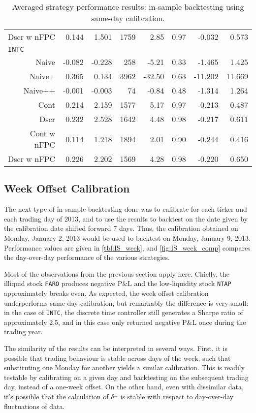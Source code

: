 \begin{table}
\begin{tabular}{@{} *{8}{r} @{}}
Dscr w nFPC & 0.144 & 1.501 & 1759 & 2.85 & 0.97 & -0.032 & 0.573 \\[2ex]
\multicolumn{8}{l}{\texttt{INTC}} \\
Naive & -0.082 & -0.228 & 258 & -5.21 & 0.33 & -1.465 & 1.425 \\ 
Naive+ & 0.365 & 0.134 & 3962 & -32.50 & 0.63 & -11.202 & 11.669 \\ 
Naive++ & -0.001 & -0.003 & 74 & -0.84 & 0.48 & -1.314 & 1.264 \\ 
Cont & 0.214 & 2.159 & 1577 & 5.17 & 0.97 & -0.213 & 0.487 \\ 
Dscr & 0.232 & 2.528 & 1642 & 4.48 & 0.98 & -0.217 & 0.611 \\ 
Cont w nFPC & 0.114 & 1.218 & 1894 & 2.01 & 0.90 & -0.244 & 0.416 \\ 
Dscr w nFPC &  0.226 & 2.202 & 1569 & 4.28 & 0.98 & -0.220 & 0.650 \\ 
\bottomrule
\end{tabular}
\caption{Averaged strategy performance results: in-sample backtesting using same-day calibration.}
\label{tbl:IS_sameday}
\end{table}

\FloatBarrier
\subsection{Week Offset Calibration}
The next type of in-sample backtesting done was to calibrate for each ticker and each trading day of 2013, and to use the results to backtest on the date given by the calibration date shifted forward 7 days. Thus, the calibration obtained on Monday, January 2, 2013 would be used to backtest on Monday, January 9, 2013. Performance values are given in \autoref{tbl:IS_week}, and \autoref{fig:IS_week_comp} compares the day-over-day performance of the various strategies. 

Most of the observations from the previous section apply here. Chiefly, the illiquid stock \texttt{FARO} produces negative P\&L and the low-liquidity stock \texttt{NTAP} approximately breaks even. As expected, the week offset calibration underperforms same-day calibration, but remarkably the difference is very small: in the case of \texttt{INTC}, the discrete time controller still generates a Sharpe ratio of approximately 2.5, and in this case only returned negative P\&L once during the trading year. 

The similarity of the results can be interpreted in several ways. First, it is possible that trading behaviour is stable across days of the week, such that substituting one Monday for another yields a similar calibration. This is readily testable by calibrating on a given day and backtesting on the subsequent trading day, instead of a one-week offset. On the other hand, even with dissimilar data, it's possible that the calculation of $\delta^\pm$ is stable with respect to day-over-day fluctuations of data.

